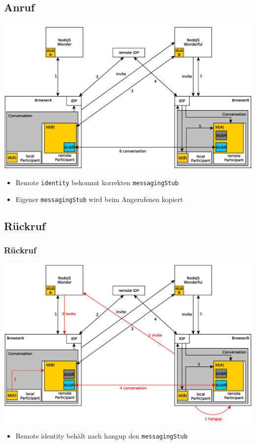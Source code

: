 \documentclass{beamer}
\begin{document}
\subsection{Anruf}
\begin{frame}
	\frametitle{}
	\includegraphics[scale=0.365,centered]{pictures/anruf1}
	\begin{itemize}
		\item Remote \texttt{identity} bekommt korrekten \texttt{messagingStub}
		\item Eigener \texttt{messagingStub} wird beim Angerufenen kopiert
	\end{itemize}

\end{frame}

\subsection{Rückruf}
\begin{frame}
	\frametitle{Rückruf}
	\includegraphics[scale=0.365,centered]{pictures/anruf2}
	\begin{itemize}[<+->]
		\item Remote identity behält nach hangup den \texttt{messagingStub} %
	\end{itemize}

\end{frame}
\end{document}
